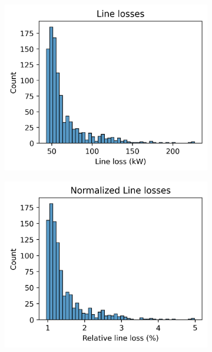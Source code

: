 \begin{figure}[H]
\begin{subfigure}{.33\textwidth}
        \caption{}
        \label{fig:appendix:urban2:histograms:max_trafo}
      \end{subfigure}%
      \begin{subfigure}{.33\textwidth}
        \centering
        \includegraphics[width=\linewidth]{img/switchstate_exploring/urban2/histograms/line_loss.png}
        \caption{}
        \label{fig:appendix:urban2:histograms:line_loss}
      \end{subfigure}%
      \begin{subfigure}{.33\textwidth}
        \centering
        \includegraphics[width=\linewidth]{img/switchstate_exploring/urban2/histograms/line_loss_relative.png}

\end{subfigure}
\end{figure}
